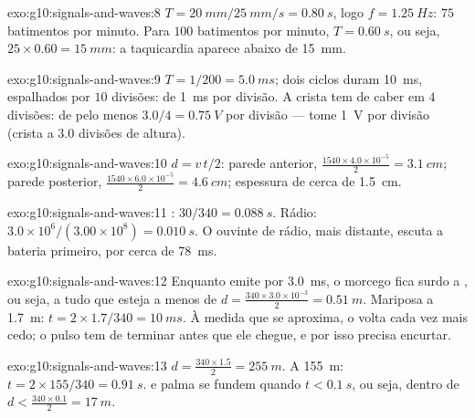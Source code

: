 \begin{solution}{exo:g10:signals-and-waves:8}
$T = \qty{20}{mm}/\qty{25}{mm/s} = \qty{0.80}{s}$, logo
$f = \qty{1.25}{Hz}$: $75$ batimentos por minuto. Para $100$ batimentos
por minuto, $T = \qty{0.60}{s}$, ou seja,
$25 \times 0.60 = \qty{15}{mm}$: a taquicardia aparece abaixo de
\qty{15}{mm}.
\end{solution}

\begin{solution}{exo:g10:signals-and-waves:9}
$T = 1/200 = \qty{5.0}{ms}$; dois ciclos duram \qty{10}{ms}, espalhados
por $10$ divisões:  de \qty{1}{ms} por divisão. A crista
tem de caber em $4$ divisões:  de pelo menos
$3.0/4 = \qty{0.75}{V}$ por divisão --- tome \qty{1}{V} por divisão
(crista a $3.0$ divisões de altura).
\end{solution}

\begin{solution}{exo:g10:signals-and-waves:10}
$d = v\,t/2$: parede anterior,
$\frac{1540 \times 4.0\times10^{-5}}{2} = \qty{3.1}{cm}$; parede
posterior, $\frac{1540 \times 6.0\times10^{-5}}{2} = \qty{4.6}{cm}$;
espessura de cerca de \qty{1.5}{cm}.
\end{solution}

\begin{solution}{exo:g10:signals-and-waves:11}
: $30/340 = \qty{0.088}{s}$. Rádio:
$3.0\times10^{6}/(3.00\times10^{8}) = \qty{0.010}{s}$. O ouvinte de
rádio, mais distante, escuta a bateria primeiro, por cerca de
\qty{78}{ms}.
\end{solution}

\begin{solution}{exo:g10:signals-and-waves:12}
Enquanto emite por \qty{3.0}{ms}, o morcego fica surdo a , ou seja, a
tudo que esteja a menos de
$d = \frac{340 \times 3.0\times10^{-3}}{2} = \qty{0.51}{m}$. Mariposa a
\qty{1.7}{m}: $t = 2 \times 1.7/340 = \qty{10}{ms}$. À medida que se
aproxima, o  volta cada vez mais cedo; o pulso tem de terminar antes
que ele chegue, e por isso precisa encurtar.
\end{solution}

\begin{solution}{exo:g10:signals-and-waves:13}
$d = \frac{340 \times 1.5}{2} = \qty{255}{m}$. A \qty{155}{m}:
$t = 2 \times 155/340 = \qty{0.91}{s}$.  e palma se fundem quando
$t < \qty{0.1}{s}$, ou seja, dentro de
$d < \frac{340 \times 0.1}{2} = \qty{17}{m}$.
\end{solution}

